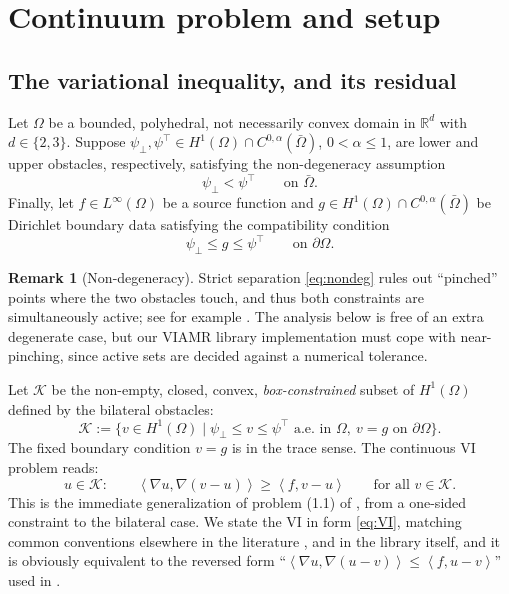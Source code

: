 \documentclass[12pt]{amsart}
\theoremstyle{definition}
\newtheorem{remark}{Remark}
\newcommand{\Om}{\Omega}
\newcommand{\dOm}{\partial\Omega}
\newcommand{\psilo}{\psi_\bot}
\newcommand{\psiup}{\psi^\top}
\begin{document}
\section{Continuum problem and setup} \label{sec:setup}

\subsection{The variational inequality, and its residual}  Let $\Om$ be a bounded, polyhedral, not necessarily convex domain in $\mathbb{R}^d$
with $d \in \{2,3\}$.  Suppose
$\psilo, \psiup \in H^1(\Om) \cap C^{0,\alpha}(\bar\Om)$, $0 < \alpha \le 1$, are
lower and upper obstacles, respectively, satisfying the non-degeneracy assumption
\begin{equation}
\label{eq:nondeg}
  \psilo < \psiup \qquad \text{on } \bar\Om.
\end{equation}
Finally, let $f \in L^\infty(\Om)$ be a source function and $g \in H^1(\Om) \cap C^{0,\alpha}(\bar\Om)$ be Dirichlet boundary data satisfying the compatibility condition
\begin{equation}
\label{eq:compat}
  \psilo \le g \le \psiup \qquad \text{on } \dOm.
\end{equation}


\begin{remark}[Non-degeneracy]
Strict separation \eqref{eq:nondeg} rules out ``pinched'' points where the two obstacles touch, and thus both constraints are simultaneously active; see for example \cite{BuelerFarrell2024}.  The analysis below is free of an extra degenerate case, but our VIAMR library implementation must cope with near-pinching, since active sets are decided against a numerical tolerance.
\end{remark}

Let $\mathcal{K}$ be the non-empty, closed, convex, \emph{box-constrained} subset of $H^1(\Om)$ defined by the bilateral obstacles:
\begin{equation}
\label{eq:K}
  \mathcal{K} := \{v \in H^1(\Om) \mid \psilo \le v \le \psiup \text{ a.e.\ in } \Om,
    \ v = g \text{ on } \dOm\}.
\end{equation}
The fixed boundary condition $v=g$ is in the trace sense.  The continuous VI problem reads:
\begin{equation}
\label{eq:VI}
  u \in \mathcal{K}: \qquad
  \left< \nabla u, \nabla(v - u)\right> \ge \left< f, v - u\right>
  \qquad \text{for all } v \in \mathcal{K}.
\end{equation}
This is the immediate generalization of problem (1.1) of \cite{NSV03}, from a one-sided constraint to the bilateral case.  We state the VI in form \eqref{eq:VI}, matching common conventions elsewhere in the literature \cite{BuelerFarrell2024,Falk1974,GraeserKornhuber2009,KinderlehrerStampacchia1980}, and in the library itself, and it is obviously equivalent to the reversed form ``$\left< \nabla u, \nabla(u - v)\right> \le \left< f, u - v\right>$'' used in \cite[formula (1.1)]{NSV03}.
\end{document}
